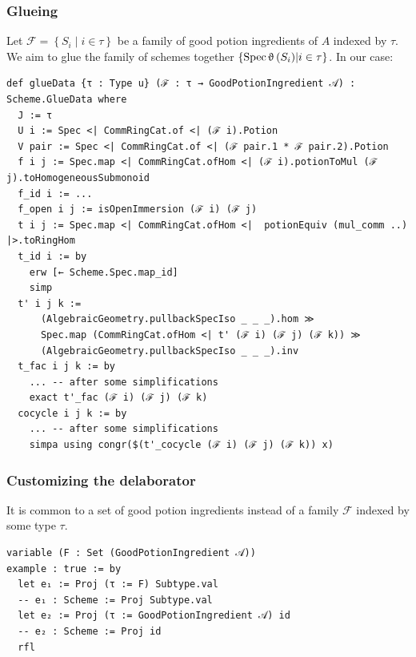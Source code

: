 \documentclass[9pt]{beamer}
\begin{document}
\begin{frame}[fragile]
  \frametitle{Glueing}
Let $\mathscr{F} = \left\{ S_i \middle| i \in \tau \right\}$ be a family of good potion ingredients of $A$ indexed by $\tau$. We aim to glue the family of schemes
together $\left\{ \operatorname{Spec} \operatorname{\upvartheta}\left( S_i \right) \middle| i \in \tau \right\}$.
In our case:

\begin{lstlisting}[extendedchars=true, basicstyle=\ttfamily\footnotesize]
def glueData {τ : Type u} (ℱ : τ → GoodPotionIngredient 𝒜) : Scheme.GlueData where
  J := τ
  U i := Spec <| CommRingCat.of <| (ℱ i).Potion
  V pair := Spec <| CommRingCat.of <| (ℱ pair.1 * ℱ pair.2).Potion
  f i j := Spec.map <| CommRingCat.ofHom <| (ℱ i).potionToMul (ℱ j).toHomogeneousSubmonoid
  f_id i := ...
  f_open i j := isOpenImmersion (ℱ i) (ℱ j)
  t i j := Spec.map <| CommRingCat.ofHom <|  potionEquiv (mul_comm ..) |>.toRingHom
  t_id i := by
    erw [← Scheme.Spec.map_id]
    simp
  t' i j k :=
      (AlgebraicGeometry.pullbackSpecIso _ _ _).hom ≫
      Spec.map (CommRingCat.ofHom <| t' (ℱ i) (ℱ j) (ℱ k)) ≫
      (AlgebraicGeometry.pullbackSpecIso _ _ _).inv
  t_fac i j k := by
    ... -- after some simplifications
    exact t'_fac (ℱ i) (ℱ j) (ℱ k)
  cocycle i j k := by
    ... -- after some simplifications
    simpa using congr($(t'_cocycle (ℱ i) (ℱ j) (ℱ k)) x)
\end{lstlisting}
\end{frame}

\begin{frame}[fragile]
\frametitle{Customizing the delaborator}
It is common to a set of good potion ingredients instead of a family $\mathscr{F}$ indexed by some type $\tau$.
\begin{lstlisting}
variable (F : Set (GoodPotionIngredient 𝒜))
example : true := by
  let e₁ := Proj (τ := F) Subtype.val
  -- e₁ : Scheme := Proj Subtype.val
  let e₂ := Proj (τ := GoodPotionIngredient 𝒜) id
  -- e₂ : Scheme := Proj id
  rfl
\end{lstlisting}
\end{frame}
\end{document}
